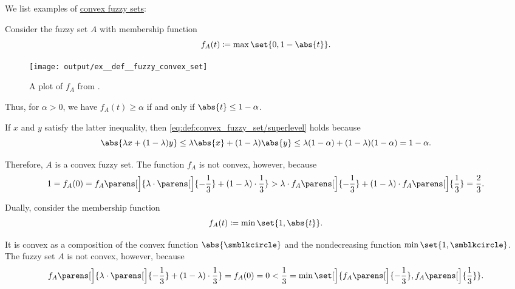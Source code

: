 \begin{example}\label{ex:def:convex_fuzzy_set}
  We list examples of \hyperref[def:convex_fuzzy_set]{convex fuzzy sets}:
  \begin{thmenum}
     Consider the fuzzy set \( A \) with membership function
    \begin{equation*}
      f_A(t) \coloneqq \max\set{ 0, 1 - \abs{t} }.
    \end{equation*}

    \begin{figure}[!ht]
      \centering
      \texttt{[image: output/ex\_\_def\_\_fuzzy\_convex\_set]}
      \caption{A plot of \( f_A \) from .}\label{fig:ex:def:convex_fuzzy_set/convex_set_not_convex_function}
    \end{figure}

    Thus, for \( \alpha > 0 \), we have \( f_A(t) \geq \alpha \) if and only if \( \abs{t} \leq 1 - \alpha \).

    If \( x \) and \( y \) satisfy the latter inequality, then \eqref{eq:def:convex_fuzzy_set/superlevel} holds because
    \begin{equation*}
      \abs{\lambda x + (1 - \lambda) y}
      \leq
      \lambda \abs{x} + (1 - \lambda) \abs{y}
      \leq
      \lambda (1 - \alpha) + (1 - \lambda) (1 - \alpha)
      =
      1 - \alpha.
    \end{equation*}

    Therefore, \( A \) is a convex fuzzy set. The function \( f_A \) is not convex, however, because
    \begin{equation*}
      1
      =
      f_A(0)
      =
      f_A\parens[\Big]{ \lambda \cdot \parens[\Big]{ - \frac 1 3 } + (1 - \lambda) \cdot \frac 1 3 }
      >
      \lambda \cdot f_A\parens[\Big]{ -\frac 1 3 } + (1 - \lambda) \cdot f_A\parens[\Big]{ \frac 1 3 }
      =
      \frac 2 3.
    \end{equation*}

     Dually, consider the membership function
    \begin{equation*}
      f_A(t) \coloneqq \min\set{ 1, \abs{t} }.
    \end{equation*}

    It is convex as a composition of the convex function \( \abs{ \anon } \) and the nondecreasing function \( \min\set{ 1, \anon } \). The fuzzy set \( A \) is not convex, however, because
    \begin{equation*}
      f_A\parens[\Big]{ \lambda \cdot \parens[\Big]{ - \frac 1 3 } + (1 - \lambda) \cdot \frac 1 3 }
      =
      f_A(0)
      =
      0
      <
      \frac 1 3
      =
      \min\set[\Big]{ f_A\parens[\Big]{ -\frac 1 3 }, f_A\parens[\Big]{ \frac 1 3 } }.
    \end{equation*}
  \end{thmenum}
\end{example}


